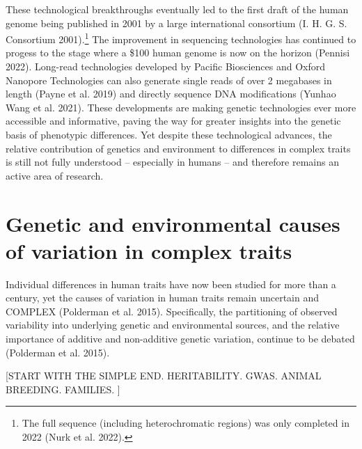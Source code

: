 \documentclass[
]{book}
\begin{document}
These technological breakthroughs eventually led to the first draft of the human genome being published in 2001 by a large international consortium (I. H. G. S. Consortium 2001).\footnote{The full sequence (including heterochromatic regions) was only completed in 2022 (Nurk et al. 2022).} The improvement in sequencing technologies has continued to progess to the stage where a \$100 human genome is now on the horizon (Pennisi 2022). Long-read technologies developed by Pacific Biosciences and Oxford Nanopore Technologies can also generate single reads of over 2 megabases in length (Payne et al. 2019) and directly sequence DNA modifications (Yunhao Wang et al. 2021). These developments are making genetic technologies ever more accessible and informative, paving the way for greater insights into the genetic basis of phenotypic differences. Yet despite these technological advances, the relative contribution of genetics and environment to differences in complex traits is still not fully understood -- especially in humans -- and therefore remains an active area of research.

\hypertarget{genetic-and-environmental-causes-of-variation-in-complex-traits}{%
\section{Genetic and environmental causes of variation in complex traits}\label{genetic-and-environmental-causes-of-variation-in-complex-traits}}

Individual differences in human traits have now been studied for more than a century, yet the causes of variation in human traits remain uncertain and COMPLEX (Polderman et al. 2015). Specifically, the partitioning of observed variability into underlying genetic and environmental sources, and the relative importance of additive and non-additive genetic variation, continue to be debated (Polderman et al. 2015).

{[}START WITH THE SIMPLE END. HERITABILITY. GWAS. ANIMAL BREEDING. FAMILIES. {]}
\end{document}
